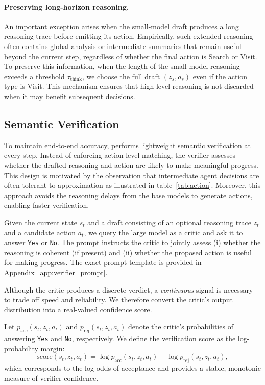 \paragraph{Preserving long-horizon reasoning.}
An important exception arises when the small-model draft produces a long reasoning trace before emitting its action.
Empirically, such extended reasoning often contains global analysis or intermediate summaries that remain useful beyond the current step, regardless of whether the final action is Search or Visit.
To preserve this information, when the length of the small-model reasoning exceeds a threshold $\tau_{\text{think}}$, we choose the full draft $(z_s, a_s)$ even if the action type is Visit.
This mechanism ensures that high-level reasoning is not discarded when it may benefit subsequent decisions.


\subsection{Semantic Verification}
\label{subsec:semantic_verification}


To maintain end-to-end accuracy, \method{} performs lightweight semantic verification at every step.
Instead of enforcing action-level matching, the verifier assesses whether the drafted reasoning and action are likely to make meaningful progress.
This design is motivated by the observation that intermediate agent decisions are often tolerant to approximation as illustrated in table~\ref{tab:action}.
Moreover, this approach avoids the reasoning delays from the base models to generate actions, enabling faster verification.   

Given the current state $s_t$ and a draft consisting of an optional reasoning trace $z_t$ and a candidate action $a_t$, we query the large model as a critic and ask it to answer \texttt{Yes} or \texttt{No}.
The prompt instructs the critic to jointly assess (i) whether the reasoning is coherent (if present) and (ii) whether the proposed action is useful for making progress.
The exact prompt template is provided in Appendix~\ref{app:verifier_prompt}.

Although the critic produces a discrete verdict, a \emph{continuous} signal is necessary to trade off speed and reliability.
We therefore convert the critic's output distribution into a real-valued confidence score.

Let $p_{\mathrm{acc}}(s_t,z_t,a_t)$ and $p_{\mathrm{rej}}(s_t,z_t,a_t)$ denote the critic's probabilities of answering \texttt{Yes} and \texttt{No}, respectively.
We define the verification score as the log-probability margin:
\begin{equation}
\mathrm{score}(s_t, z_t, a_t)
=
\log p_{\mathrm{acc}}(s_t, z_t, a_t)
-
\log p_{\mathrm{rej}}(s_t, z_t, a_t),
\label{eq:verifier_score}
\end{equation}
which corresponds to the log-odds of acceptance and provides a stable, monotonic measure of verifier confidence.

